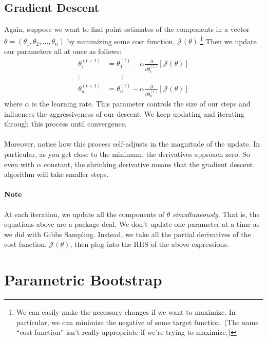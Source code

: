 \documentclass[12pt]{article}
\begin{document}
\newpage
\subsection{Gradient Descent}

Again, suppose we want to find point estimates of the components in
a vector $\theta = (\theta_1, \theta_2, \ldots, \theta_n)$ by
minimizing some cost function, $\mathcal{J}(\theta)$.\footnote{We
can easily make the necessary changes if we want to maximize. In
particular, we can minimize the negative of some target function. (The
name ``cost function'' isn't really appropriate if we're trying to 
maximize.)} Then we update our parameters all at once as follows:
\begin{align*}
   \theta_1^{(t+1)} &= \theta_1^{(t)} - \alpha \frac{\partial}{
      \partial \theta_1^{(t)}}\left[ \mathcal{J}(\theta)\right]\\
   \vdots \qquad & \qquad \vdots \\
   \theta_n^{(t+1)} &= \theta_n^{(t)} - \alpha \frac{\partial}{
      \partial \theta_n^{(t)}}\left[ \mathcal{J}(\theta)\right]
\end{align*}
where $\alpha$ is the learning rate. This parameter controls the
size of our steps and influences the aggressiveness of our 
descent.
We keep updating and iterating through this process until convergence.  
\\
\\
Moreover, notice how this process self-adjusts in the
magnitude of the update.  In particular, as you get close to
the minimum, the derivatives approach zero.  So even with 
$\alpha$ constant, the shrinking derivative means that the gradient
descent algorithm will take smaller steps.


\paragraph{Note} At each iteration, we update all the components of 
$\theta$ \emph{simultaneously}. That is, the equations above are a 
package deal. We don't update one parameter at a time as we did
with Gibbs Sampling. Instead, we take all the partial derivatives
of the cost function, $\mathcal{J}(\theta)$, then plug into the RHS
of the above expressions.







\newpage
\section{Parametric Bootstrap}
\end{document}
